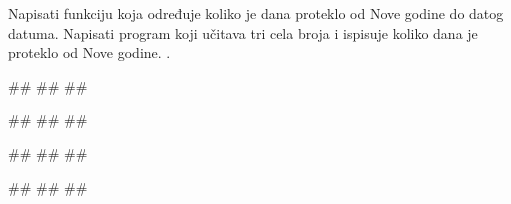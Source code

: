 \begin{Exercise}[label=od_nove_godine] 
Napisati funkciju  koja određuje koliko je dana proteklo od Nove godine do
datog datuma. Napisati program koji učitava tri cela broja i ispisuje
koliko dana je proteklo od Nove godine. .

\begin{miditest}
\begin{upotreba}{1}
#\naslovInt#
##
##
\end{upotreba}
\end{miditest}
\begin{miditest}
\begin{upotreba}{2}
#\naslovInt#
##
##
\end{upotreba}
\end{miditest}

\begin{miditest}
\begin{upotreba}{3}
#\naslovInt#
##
##
\end{upotreba}
\end{miditest}
\begin{miditest}
\begin{upotreba}{4}
#\naslovInt#
##
##
\end{upotreba}
\end{miditest}

\end{Exercise}

